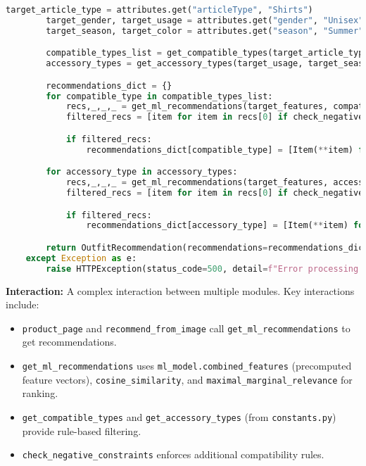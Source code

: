 \documentclass[12pt,a4paper]{article}
\begin{document}
\begin{lstlisting}[language=Python]
        target_article_type = attributes.get("articleType", "Shirts")
        target_gender, target_usage = attributes.get("gender", "Unisex"), attributes.get("usage", "Casual")
        target_season, target_color = attributes.get("season", "Summer"), attributes.get("baseColour", "Black")

        compatible_types_list = get_compatible_types(target_article_type)
        accessory_types = get_accessory_types(target_usage, target_season)

        recommendations_dict = {}
        for compatible_type in compatible_types_list:
            recs,_,_,_ = get_ml_recommendations(target_features, compatible_type, target_gender, target_color)
            filtered_recs = [item for item in recs[0] if check_negative_constraints(attributes, item)]

            if filtered_recs:
                recommendations_dict[compatible_type] = [Item(**item) for item in filtered_recs]

        for accessory_type in accessory_types:
            recs,_,_,_ = get_ml_recommendations(target_features, accessory_type, target_gender, target_color)
            filtered_recs = [item for item in recs[0] if check_negative_constraints(attributes, item)]

            if filtered_recs:
                recommendations_dict[accessory_type] = [Item(**item) for item in filtered_recs]

        return OutfitRecommendation(recommendations=recommendations_dict)
    except Exception as e:
        raise HTTPException(status_code=500, detail=f"Error processing image: {str(e)}")
\end{lstlisting}

\textbf{Interaction:}  A complex interaction between multiple modules.  Key interactions include:
\begin{itemize}
    \item \texttt{product\_page} and \texttt{recommend\_from\_image} call \texttt{get\_ml\_recommendations} to get recommendations.
    \item \texttt{get\_ml\_recommendations} uses \texttt{ml\_model.combined\_features} (precomputed feature vectors), \texttt{cosine\_similarity}, and \texttt{maximal\_marginal\_relevance} for ranking.
    \item \texttt{get\_compatible\_types} and \texttt{get\_accessory\_types} (from \texttt{constants.py}) provide rule-based filtering.
    \item \texttt{check\_negative\_constraints} enforces additional compatibility rules.
\end{itemize}
\end{document}

